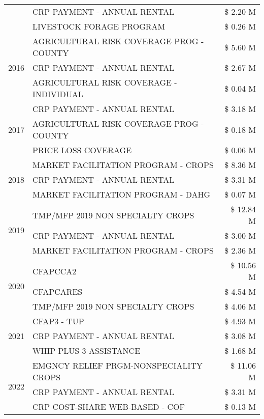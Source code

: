 \begin{tabular}{llr}
 & CRP PAYMENT - ANNUAL RENTAL & \$ 2.20 M \\
 & LIVESTOCK FORAGE PROGRAM & \$ 0.26 M \\
\cline{1-3}
\multirow[t]{3}{*}{2016} & AGRICULTURAL RISK COVERAGE PROG - COUNTY & \$ 5.60 M \\
 & CRP PAYMENT - ANNUAL RENTAL & \$ 2.67 M \\
 & AGRICULTURAL RISK COVERAGE - INDIVIDUAL & \$ 0.04 M \\
\cline{1-3}
\multirow[t]{3}{*}{2017} & CRP PAYMENT - ANNUAL RENTAL & \$ 3.18 M \\
 & AGRICULTURAL RISK COVERAGE PROG - COUNTY & \$ 0.18 M \\
 & PRICE LOSS COVERAGE & \$ 0.06 M \\
\cline{1-3}
\multirow[t]{3}{*}{2018} & MARKET FACILITATION PROGRAM - CROPS & \$ 8.36 M \\
 & CRP PAYMENT - ANNUAL RENTAL & \$ 3.31 M \\
 & MARKET FACILITATION PROGRAM - DAHG & \$ 0.07 M \\
\cline{1-3}
\multirow[t]{3}{*}{2019} & TMP/MFP 2019 NON SPECIALTY CROPS & \$ 12.84 M \\
 & CRP PAYMENT - ANNUAL RENTAL & \$ 3.00 M \\
 & MARKET FACILITATION PROGRAM - CROPS & \$ 2.36 M \\
\cline{1-3}
\multirow[t]{3}{*}{2020} & CFAPCCA2 & \$ 10.56 M \\
 & CFAPCARES & \$ 4.54 M \\
 & TMP/MFP 2019 NON SPECIALTY CROPS & \$ 4.06 M \\
\cline{1-3}
\multirow[t]{3}{*}{2021} & CFAP3 - TUP & \$ 4.93 M \\
 & CRP PAYMENT - ANNUAL RENTAL & \$ 3.08 M \\
 & WHIP PLUS 3 ASSISTANCE & \$ 1.68 M \\
\cline{1-3}
\multirow[t]{3}{*}{2022} & EMGNCY RELIEF PRGM-NONSPECIALITY CROPS & \$ 11.06 M \\
 & CRP PAYMENT - ANNUAL RENTAL & \$ 3.31 M \\
 & CRP COST-SHARE WEB-BASED - COF & \$ 0.13 M \\
\cline{1-3}
\bottomrule
\end{tabular}
